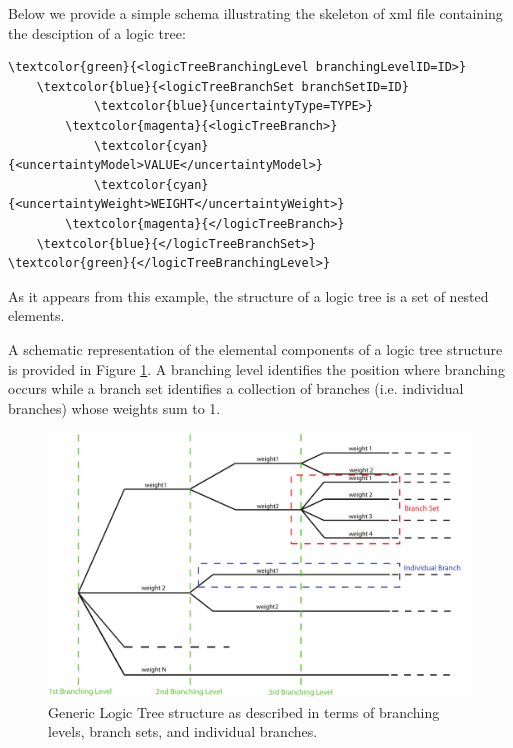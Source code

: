 Below we provide a simple schema illustrating the skeleton of xml file 
containing the desciption of a logic tree:
\begin{Verbatim}[frame=single, commandchars=\\\{\}, fontsize=\small]
\textcolor{green}{<logicTreeBranchingLevel branchingLevelID=ID>}
    \textcolor{blue}{<logicTreeBranchSet branchSetID=ID}
            \textcolor{blue}{uncertaintyType=TYPE>}
        \textcolor{magenta}{<logicTreeBranch>}
            \textcolor{cyan}{<uncertaintyModel>VALUE</uncertaintyModel>}
            \textcolor{cyan}{<uncertaintyWeight>WEIGHT</uncertaintyWeight>}
        \textcolor{magenta}{</logicTreeBranch>}
    \textcolor{blue}{</logicTreeBranchSet>}
\textcolor{green}{</logicTreeBranchingLevel>}
\end{Verbatim}
As it appears from this example, the structure of a logic 
tree is a set of nested elements.

A schematic representation of the elemental components of a logic tree 
structure is provided in Figure \ref{glts}. 
A branching level identifies the position where branching occurs while 
a branch set identifies a collection of branches (i.e. individual branches) 
whose weights sum to 1.
%
\begin{figure}[!h]
\centering
\includegraphics[width=15cm]{figures/hazard/GenericLogicTreeStructure.pdf}
\caption{Generic Logic Tree structure as described in terms of branching 
levels, branch sets, and individual branches.}
\label{glts}
\end{figure}

